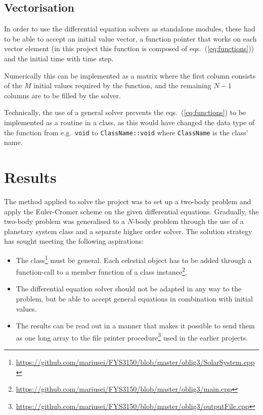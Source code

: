 \documentclass[a4paper,11pt]{article}
\begin{document}
\subsection{Vectorisation}
In order to use the differential equation solvers as standalone modules, these had to be able to accept an initial value vector, a function pointer that works on each vector element (in this project this function is composed of eqs.~(\ref{eq:functions})) and the initial time with time step. 

Numerically this can be implemented as a matrix where the first column consists of the $M$ initial values required by the function, and the remaining $N-1$ columns are to be filled by the solver. 

Technically, the use of a general solver prevents the eqs.~(\ref{eq:functions}) to be implemented as a routine in a class, as this would have changed the data type of the function from e.g.~\texttt{void} to \texttt{ClassName::void} where \texttt{ClassName} is the class' name.


\section{Results}
The method applied to solve the project was to set up a two-body problem and apply the Euler-Cromer scheme on the given differential equations. Gradually, the two-body problem was generalised to a $N$-body problem through the use of a planetary system class and a separate higher order solver. The solution strategy has sought meeting the following aspirations:
\begin{itemize}
    \item The class\footnote{\url{https://github.com/mariusei/FYS3150/blob/master/oblig3/SolarSystem.cpp}} must be general. Each celestial object has to be added through a function-call to a member function of a class instance\footnote{\url{https://github.com/mariusei/FYS3150/blob/master/oblig3/main.cpp}}. 
    \item The differential equation solver should not be adapted in any way to the problem, but be able to accept general equations in combination with initial values. 
    \item The results can be read out in a manner that makes it possible to send them as one long array to the file printer procedure\footnote{\url{https://github.com/mariusei/FYS3150/blob/master/oblig3/outputFile.cpp}} used in the earlier projects.
\end{itemize}
\end{document}
